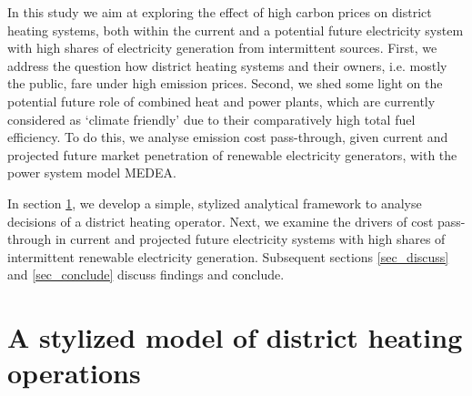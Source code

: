 \documentclass[preprint, 12pt, authoryear]{elsarticle}
\begin{document}
In this study we aim at exploring the effect of high carbon prices on district heating systems, both within the current and a potential future electricity system with high shares of electricity generation from intermittent sources. First, we address the question how district heating systems and their owners, i.e. mostly the public, fare under high emission prices.
Second, we shed some light on the potential future role of combined heat and power plants, which are currently considered as `climate friendly' due to their comparatively high total fuel efficiency. 
To do this, we analyse emission cost pass-through, given current and projected future market penetration of renewable electricity generators, with the power system model MEDEA.%

In section \ref{dh_model}, we develop a simple, stylized analytical framework to analyse decisions of a district heating operator. 
Next, we examine the drivers of  cost pass-through in current and projected future electricity systems with high shares of intermittent renewable electricity generation. Subsequent sections \ref{sec_discuss} and \ref{sec_conclude} discuss findings and conclude.


\section{A stylized model of district heating operations} \label{dh_model}
\end{document}
